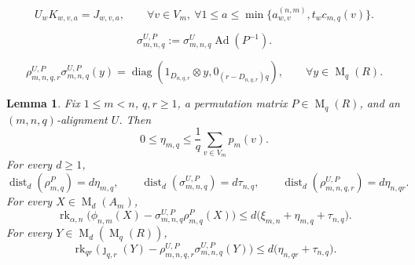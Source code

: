 \documentclass[10pt,a4paper]{amsart}
\newtheorem{lemma}{Lemma}
\DeclareMathOperator{\Ad}{Ad}
\DeclareMathOperator{\Mat}{M}
\DeclareMathOperator{\diag}{diag}
\DeclareMathOperator{\rk}{rk}
\begin{document}
\begin{equation}\label{eq:alignment-coordinate-match}
 U_wK_{w,v,a}=J_{w,v,a},
 \qquad \forall v\in V_m,\ \forall 1\leq a\leq \min\{a_{w,v}^{(n,m)},t_wc_{m,q}(v)\}.
\end{equation}

\begin{equation}\label{eq:aligned-packing-P}
 \sigma_{m,n,q}^{U,P}
 :=\sigma_{m,n,q}^{U}\Ad(P^{-1}).
\end{equation}

\begin{equation}\label{eq:return-map-composition}
 \rho_{m,n,q,r}^{U,P}\sigma_{m,n,q}^{U,P}(y)
 =\diag(1_{D_{n,q,r}}\otimes y,0_{(r-D_{n,q,r})q}),
 \qquad \forall y\in\Mat_q(R).
\end{equation}

\begin{lemma}
\label{lem:finite-model-estimates}
Fix $1\leq m<n$, $q,r\geq1$, a permutation matrix $P\in\Mat_q(R)$, and an
$(m,n,q)$-alignment $U$.
Then
\begin{equation}\label{eq:eta}
 0\leq\eta_{m,q}\leq\frac1q\sum_{v\in V_m}p_m(v).
\end{equation}
For every $d\geq1$,
\begin{equation}\label{eq:amplified-eta}
 \operatorname{dist}_d(\rho_{m,q}^{P})=d\eta_{m,q},
 \qquad
 \operatorname{dist}_d(\sigma_{m,n,q}^{U,P})=d\tau_{n,q},
 \qquad
 \operatorname{dist}_d(\rho_{m,n,q,r}^{U,P})=d\eta_{n,qr}.
\end{equation}
For every $X\in\Mat_d(A_m)$,
\begin{equation}\label{eq:parameter-first-square}
 \rk_{\alpha,n}\bigl(
   \phi_{n,m}(X)-
   \sigma_{m,n,q}^{U,P}\rho_{m,q}^{P}(X)
 \bigr)
 \leq d\bigl(\xi_{m,n}+\eta_{m,q}+\tau_{n,q}\bigr).
\end{equation}
For every $Y\in\Mat_d(\Mat_q(R))$,
\begin{equation}
   \label{eq:parameter-second-square}
  \rk_{qr}\bigl(
   \jmath_{q,r}(Y)-
   \rho_{m,n,q,r}^{U,P}\sigma_{m,n,q}^{U,P}(Y)
 \bigr)
 \leq d\bigl(\eta_{n,qr}+\tau_{n,q}\bigr).
\end{equation}
\end{lemma}
\end{document}
